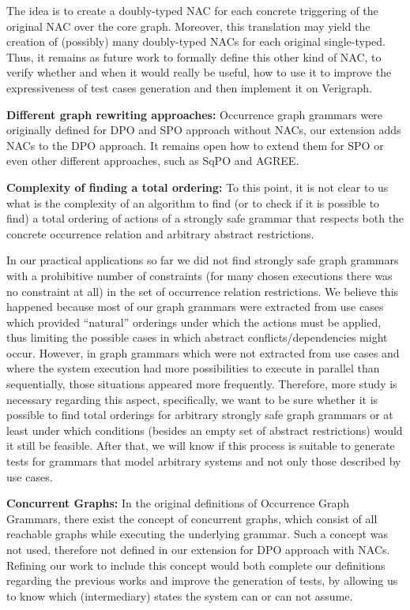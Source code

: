 The idea is to create a doubly-typed NAC for each concrete triggering of the original NAC over the core graph. Moreover, this translation may yield the creation of (possibly) many doubly-typed NACs for each original single-typed. Thus, it remains as future work to formally define this other kind of NAC, to verify whether and when it would really be useful, how to use it to improve the expressiveness of test cases generation and then implement it on Verigraph.


\textbf{Different graph rewriting approaches:} Occurrence graph grammars were originally defined for DPO and SPO approach without NACs, our extension adds NACs to the DPO approach. It remains open how to extend them for SPO or even other different approaches, such as SqPO and AGREE.

\textbf{Complexity of finding a total ordering:} To this point, it is not clear to us what is the complexity of an algorithm to find (or to check if it is possible to find) a total ordering of actions of a strongly safe grammar that respects both the concrete occurrence relation and arbitrary abstract restrictions.

  In our practical applications so far we did not find strongly safe graph grammars with a prohibitive number of constraints (for many chosen executions there was no constraint at all) in the set of occurrence relation restrictions.
  We believe this happened because most of our graph grammars were extracted from use cases which provided ``natural'' orderings under which the actions must be applied, thus limiting the possible cases in which abstract conflicts/dependencies might occur.
  However, in graph grammars which were not extracted from use cases and where the system execution had more possibilities to execute in parallel than sequentially, those situations appeared more frequently.
  Therefore, more study is necessary regarding this aspect, specifically, we want to be sure whether it is possible to find total orderings for arbitrary strongly safe graph grammars or at least under which conditions (besides an empty set of abstract restrictions) would it still be feasible.
  After that, we will know if this process is suitable to generate tests for grammars that model arbitrary systems and not only those described by use cases.

\textbf{Concurrent Graphs:} In the original definitions of Occurrence Graph Grammars, there exist the concept of concurrent graphs, which consist of all reachable graphs while executing the underlying grammar. Such a concept was not used, therefore not defined in our extension for DPO approach with NACs. Refining our work to include this concept would both complete our definitions regarding the previous works and improve the generation of tests, by allowing us to know which (intermediary) states the system can or can not assume.

